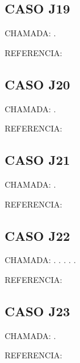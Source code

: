 \documentclass{undftex}
\begin{document}
\begin{refsection}\section*{CASO J19} CHAMADA: . \textcite{j19}\par REFERENCIA:\par\printbibliography[heading=none,check=undfconsultadas]\end{refsection}\clearpage
\begin{refsection}\section*{CASO J20} CHAMADA: . \textcite{j20}\par REFERENCIA:\par\printbibliography[heading=none,check=undfconsultadas]\end{refsection}\clearpage
\begin{refsection}\section*{CASO J21} CHAMADA: . \textcite{j21}\par REFERENCIA:\par\printbibliography[heading=none,check=undfconsultadas]\end{refsection}\clearpage
\begin{refsection}\section*{CASO J22} CHAMADA: . \textcite{j22b}. . . . \par REFERENCIA:\par\printbibliography[heading=none,check=undfconsultadas]\end{refsection}\clearpage
\begin{refsection}\section*{CASO J23} CHAMADA: . \textcite{j23}\par REFERENCIA:\par\printbibliography[heading=none,check=undfconsultadas]\end{refsection}\clearpage
\end{document}

